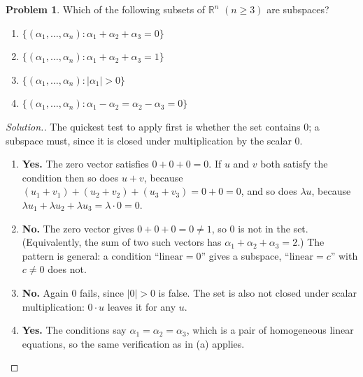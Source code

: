 \documentclass[11pt,a4paper]{article}
\theoremstyle{definition}
\newtheorem{problemx}{Problem}[section]
\newenvironment{problem}{\begin{problemx}}{\end{problemx}}
\newenvironment{solution}
  {\renewcommand{\qedsymbol}{}\begin{proof}[\textit{Solution}.]}
  {\end{proof}}
\begin{document}
\begin{problem}
Which of the following subsets of $\mathbb{R}^n$ $(n\geq 3)$ are subspaces?
\begin{enumerate}
\item[(a)] $\{(\alpha_1,\dots,\alpha_n):\alpha_1+\alpha_2+\alpha_3=0\}$
\item[(b)] $\{(\alpha_1,\dots,\alpha_n):\alpha_1+\alpha_2+\alpha_3=1\}$
\item[(c)] $\{(\alpha_1,\dots,\alpha_n):|\alpha_1|>0\}$
\item[(d)] $\{(\alpha_1,\dots,\alpha_n):\alpha_1-\alpha_2=\alpha_2-\alpha_3=0\}$
\end{enumerate}
\end{problem}
\begin{solution}
The quickest test to apply first is whether the set contains $0$; a subspace
must, since it is closed under multiplication by the scalar $0$.

\begin{enumerate}
\item[(a)] \textbf{Yes.} The zero vector satisfies $0+0+0=0$. If $u$ and $v$
both satisfy the condition then so does $u+v$, because
$(u_1+v_1)+(u_2+v_2)+(u_3+v_3)=0+0=0$, and so does $\lambda u$, because
$\lambda u_1+\lambda u_2+\lambda u_3=\lambda\cdot 0=0$.

\item[(b)] \textbf{No.} The zero vector gives $0+0+0=0\neq 1$, so $0$ is not in
the set. (Equivalently, the sum of two such vectors has
$\alpha_1+\alpha_2+\alpha_3=2$.) The pattern is general: a condition
``$\text{linear}=0$'' gives a subspace, ``$\text{linear}=c$'' with $c\neq 0$
does not.

\item[(c)] \textbf{No.} Again $0$ fails, since $|0|>0$ is false. The set is also
not closed under scalar multiplication: $0\cdot u$ leaves it for any $u$.

\item[(d)] \textbf{Yes.} The conditions say $\alpha_1=\alpha_2=\alpha_3$, which
is a pair of homogeneous linear equations, so the same verification as in (a)
applies.
\end{enumerate}
\end{solution}
\end{document}
